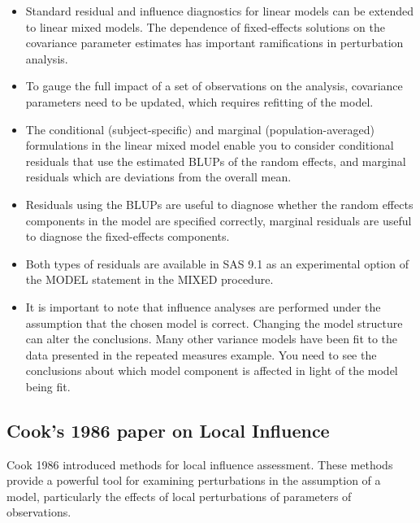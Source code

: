 \documentclass[12pt, a4paper]{article}
\begin{document}
\begin{itemize}
	\item Standard residual and inﬂuence diagnostics for linear models can be extended to linear mixed models. The dependence of ﬁxed-effects solutions on the covariance parameter estimates has important ramiﬁcations in perturbation analysis. 
	\item To gauge the full impact of a set of observations on the analysis, covariance parameters need to be updated, which requires reﬁtting of the model. 
	
	\item The conditional (subject-speciﬁc) and marginal (population-averaged) formulations in the linear mixed model enable you to consider conditional residuals that use the estimated BLUPs of the random effects, and marginal residuals which are deviations from the overall mean. 
	\item Residuals using the BLUPs are useful to diagnose whether the random effects components in the model are speciﬁed correctly, marginal residuals are useful to diagnose the ﬁxed-effects components. 
	\item Both types of residuals are available in SAS 9.1 as an experimental option of the MODEL statement in the MIXED procedure.
	
	\item It is important to note that influence analyses are performed under the assumption that the chosen model is correct. Changing the model structure can alter the conclusions. Many other variance models have been ﬁt to the data presented in the repeated measures example. You need to see the conclusions about which model component is affected in light of the model being fit.
\end{itemize}






\subsection{Cook's 1986 paper on Local Influence}%
Cook 1986 introduced methods for local influence assessment. These methods provide a powerful tool for examining perturbations in the assumption of a model, particularly the effects of local perturbations of parameters of observations.
\end{document}
